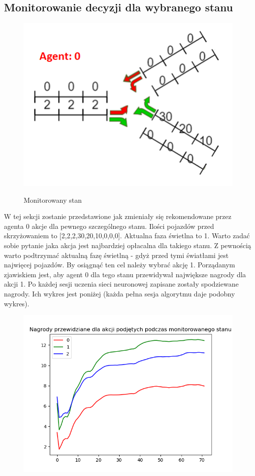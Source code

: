 \documentclass[12pt]{book}
\theoremstyle{plain}
\begin{document}
\subsection{Monitorowanie decyzji dla wybranego stanu}\label{subsec:env_4_monitorowanie_stanu}
\begin{figure}[h]
	\centering
	\includegraphics[width=12cm]{monitorowany_stan}
	\label{fig:monitorowany_stan}
	\caption{Monitorowany stan}
\end{figure}
W tej sekcji zostanie przedstawione jak zmieniały się rekomendowane przez agenta 0 akcje dla pewnego szczególnego stanu. Ilości pojazdów przed skrzyżowaniem to [2,2,2,30,20,10,0,0,0]. Aktualna faza świetlna to 1. Warto zadać sobie pytanie jaka akcja jest najbardziej opłacalna dla takiego stanu. Z pewnością warto podtrzymać aktualną fazę świetlną - gdyż przed tymi światłami jest najwięcej pojazdów. By osiągnąć ten cel należy wybrać akcję 1. Porządanym zjawiskiem jest, aby agent 0 dla tego stanu przewidywał największe nagrody dla akcji 1. Po każdej sesji uczenia sieci neuronowej zapisane zostały spodziewane nagrody. Ich wykres jest poniżej (każda pełna sesja algorytmu daje podobny wykres).
	\begin{figure}[H]
		\centering
		\includegraphics[width=14cm]{env_4_monitorowany_stan_wykres}
		\label{fig:env_4_monitorowany_stan_wykres}
	\end{figure}
	
\end{document}
